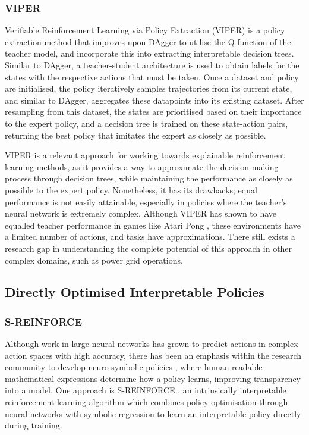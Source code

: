 \subsubsection{VIPER}

Verifiable Reinforcement Learning via Policy Extraction (VIPER) \cite{bastani2018verifiable} is a policy extraction method that improves upon DAgger to utilise the Q-function of the teacher model, and incorporate this into extracting interpretable decision trees. Similar to DAgger, a teacher-student architecture is used to obtain labels for the states with the respective actions that must be taken. Once a dataset and policy are initialised, the policy iteratively samples trajectories from its current state, and similar to DAgger, aggregates these datapoints into its existing dataset. After resampling from this dataset, the states are prioritised based on their importance to the expert policy, and a decision tree is trained on these state-action pairs, returning the best policy that imitates the expert as closely as possible. 

VIPER is a relevant approach for working towards explainable reinforcement learning methods, as it provides a way to approximate the decision-making process through decision trees, while maintaining the performance as closely as possible to the expert policy. Nonetheless, it has its drawbacks; equal performance is not easily attainable, especially in policies where the teacher's neural network is extremely complex. Although VIPER has shown to have equalled teacher performance in games like Atari Pong \cite{bastani2018verifiable}, these environments have a limited number of actions, and tasks have approximations. There still exists a research gap in understanding the complete potential of this approach in other complex domains, such as power grid operations. 

\subsection{Directly Optimised Interpretable Policies}

\subsubsection{S-REINFORCE}

Although work in large neural networks has grown to predict actions in complex action spaces with high accuracy, there has been an emphasis within the research community to develop neuro-symbolic policies \cite{li2025symbolic, garnelo2016towards}, where human-readable mathematical expressions determine how a policy learns, improving transparency into a model. One approach is S-REINFORCE \cite{dutta2023s}, an intrinsically interpretable reinforcement learning algorithm which combines policy optimisation through neural networks with symbolic regression to learn an interpretable policy directly during training.

